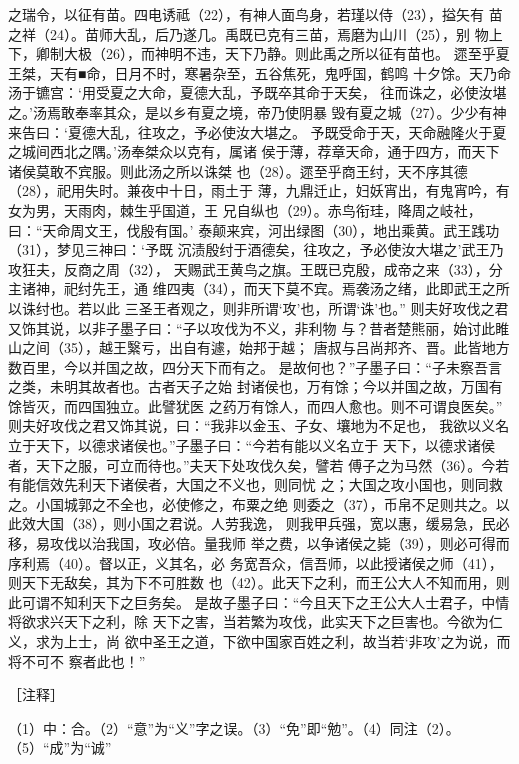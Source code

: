 \documentclass[12pt,UTF8]{ctexbook}
\begin{document}
之瑞令，以征有苗。四电诱祗（22），有神人面鸟身，若瑾以侍（23），搤矢有 
苗之祥（24）。苗师大乱，后乃遂几。禹既已克有三苗，焉磨为山川（25），别 
物上下，卿制大极（26），而神明不违，天下乃静。则此禹之所以征有苗也。 
遝至乎夏王桀，天有■命，日月不时，寒暑杂至，五谷焦死，鬼呼国，鹤鸣 
十夕馀。天乃命汤于镳宫：‘用受夏之大命，夏德大乱，予既卒其命于天矣， 
往而诛之，必使汝堪之。’汤焉敢奉率其众，是以乡有夏之境，帝乃使阴暴 
毁有夏之城（27）。少少有神来告曰：‘夏德大乱，往攻之，予必使汝大堪之。 
予既受命于天，天命融隆火于夏之城间西北之隅。’汤奉桀众以克有，属诸 
侯于薄，荐章天命，通于四方，而天下诸侯莫敢不宾服。则此汤之所以诛桀 
也（28）。遝至乎商王纣，天不序其德（28），祀用失时。兼夜中十日，雨土于 
薄，九鼎迁止，妇妖宵出，有鬼宵吟，有女为男，天雨肉，棘生乎国道，王 
兄自纵也（29）。赤鸟衔珪，降周之岐社，曰：“天命周文王，伐殷有国。’ 
泰颠来宾，河出绿图（30），地出乘黄。武王践功（31），梦见三神曰：‘予既 
沉渍殷纣于酒德矣，往攻之，予必使汝大堪之’武王乃攻狂夫，反商之周（32）， 
天赐武王黄鸟之旗。王既已克殷，成帝之来（33），分主诸神，祀纣先王，通 
维四夷（34），而天下莫不宾。焉袭汤之绪，此即武王之所以诛纣也。若以此 
三圣王者观之，则非所谓‘攻’也，所谓‘诛’也。” 
则夫好攻伐之君又饰其说，以非子墨子曰：“子以攻伐为不义，非利物 
与？昔者楚熊丽，始讨此睢山之间（35），越王繄亏，出自有遽，始邦于越； 
唐叔与吕尚邦齐、晋。此皆地方数百里，今以并国之故，四分天下而有之。 
是故何也？”子墨子曰：“子未察吾言之类，未明其故者也。古者天子之始 
封诸侯也，万有馀；今以并国之故，万国有馀皆灭，而四国独立。此譬犹医 
之药万有馀人，而四人愈也。则不可谓良医矣。” 
则夫好攻伐之君又饰其说，曰：“我非以金玉、子女、壤地为不足也， 
我欲以义名立于天下，以德求诸侯也。”子墨子曰：“今若有能以义名立于 
天下，以德求诸侯者，天下之服，可立而待也。”夫天下处攻伐久矣，譬若 
傅子之为马然（36）。今若有能信效先利天下诸侯者，大国之不义也，则同忧 
之；大国之攻小国也，则同救之。小国城郭之不全也，必使修之，布粟之绝 
则委之（37），币帛不足则共之。以此效大国（38），则小国之君说。人劳我逸， 
则我甲兵强，宽以惠，缓易急，民必移，易攻伐以治我国，攻必倍。量我师 
举之费，以争诸侯之毙（39），则必可得而序利焉（40）。督以正，义其名，必 
务宽吾众，信吾师，以此授诸侯之师（41），则天下无敌矣，其为下不可胜数 
也（42）。此天下之利，而王公大人不知而用，则此可谓不知利天下之巨务矣。 
是故子墨子曰：“今且天下之王公大人士君子，中情将欲求兴天下之利，除 
天下之害，当若繁为攻伐，此实天下之巨害也。今欲为仁义，求为上士，尚 
欲中圣王之道，下欲中国家百姓之利，故当若‘非攻’之为说，而将不可不 
察者此也！” 


［注释］ 

（1）中：合。（2）“意”为“义”字之误。（3）“免”即“勉”。（4）同注（2）。（5）“成”为“诚” 
\end{document}
